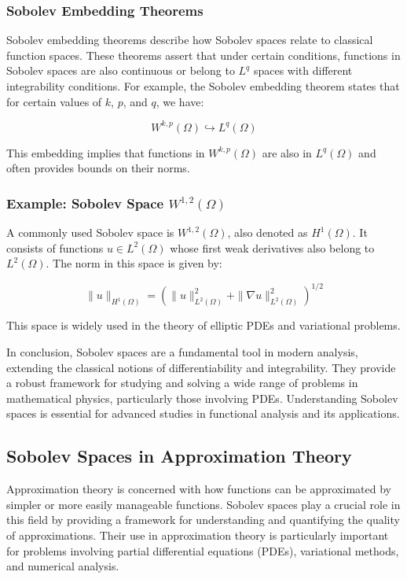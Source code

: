 \documentclass[11pt,a4paper]{article}
\begin{document}
\subsubsection{Sobolev Embedding Theorems}

Sobolev embedding theorems describe how Sobolev spaces relate to classical function spaces. These theorems assert that under certain conditions, functions in Sobolev spaces are also continuous or belong to \(L^q\) spaces with different integrability conditions. For example, the Sobolev embedding theorem states that for certain values of \(k\), \(p\), and \(q\), we have:

\[ W^{k,p}(\Omega) \hookrightarrow L^q(\Omega) \]

This embedding implies that functions in \(W^{k,p}(\Omega)\) are also in \(L^q(\Omega)\) and often provides bounds on their norms.

\subsubsection{Example: Sobolev Space \(W^{1,2}(\Omega)\)}

A commonly used Sobolev space is \(W^{1,2}(\Omega)\), also denoted as \(H^1(\Omega)\). It consists of functions \(u \in L^2(\Omega)\) whose first weak derivatives also belong to \(L^2(\Omega)\). The norm in this space is given by:

\[ \|u\|_{H^1(\Omega)} = \left( \|u\|_{L^2(\Omega)}^2 + \|\nabla u\|_{L^2(\Omega)}^2 \right)^{1/2} \]

This space is widely used in the theory of elliptic PDEs and variational problems.

In conclusion, Sobolev spaces are a fundamental tool in modern analysis, extending the classical notions of differentiability and integrability. They provide a robust framework for studying and solving a wide range of problems in mathematical physics, particularly those involving PDEs. Understanding Sobolev spaces is essential for advanced studies in functional analysis and its applications.

\subsection{Sobolev Spaces in Approximation Theory}

Approximation theory is concerned with how functions can be approximated by simpler or more easily manageable functions. Sobolev spaces play a crucial role in this field by providing a framework for understanding and quantifying the quality of approximations. Their use in approximation theory is particularly important for problems involving partial differential equations (PDEs), variational methods, and numerical analysis.
\end{document}
